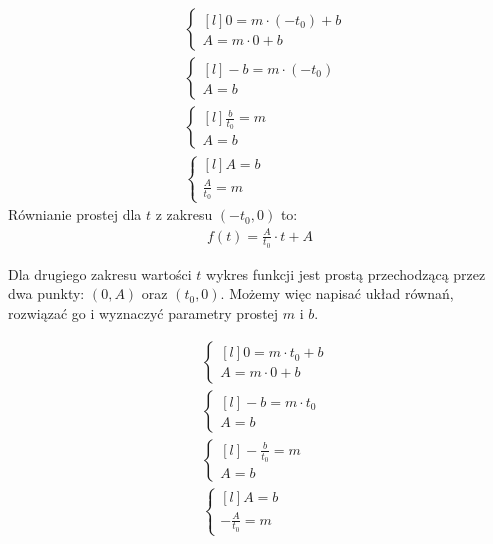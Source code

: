 \begin{task}
\begin{align*}
&\left\{\begin{matrix*}[l]
0 = m\cdot (-t_{0}) +b\\ 
A = m\cdot 0 +b
\end{matrix*}\right. \\
&\left\{\begin{matrix*}[l]
-b = m\cdot (-t_{0})\\ 
A = b
\end{matrix*}\right. \\
&\left\{\begin{matrix*}[l]
\frac{b}{t_{0}} = m\\ 
A = b
\end{matrix*}\right. \\
&\left\{\begin{matrix*}[l]
A = b\\ 
\frac{A}{t_{0}} = m
\end{matrix*}\right.
\end{align*}
Równianie prostej dla $t$ z zakresu  $(-t_{0},0)$ to:
\begin{align*}
f(t) = \frac{A}{t_{0}}\cdot t + A
\end{align*}

Dla drugiego zakresu wartości $t$ wykres funkcji jest prostą przechodzącą przez dwa punkty: $(0,A)$ oraz $(t_{0},0)$. Możemy więc napisać układ równań, rozwiązać go i wyznaczyć parametry prostej $m$ i $b$.  

\begin{align*}
&\left\{\begin{matrix*}[l]
0 = m\cdot t_{0} +b\\ 
A = m\cdot 0 +b
\end{matrix*}\right. \\
&\left\{\begin{matrix*}[l]
-b = m\cdot t_{0}\\ 
A = b
\end{matrix*}\right. \\
&\left\{\begin{matrix*}[l]
-\frac{b}{t_{0}} = m\\ 
A = b
\end{matrix*}\right. \\
&\left\{\begin{matrix*}[l]
A = b\\ 
-\frac{A}{t_{0}} = m
\end{matrix*}\right.
\end{align*}


\end{task}
